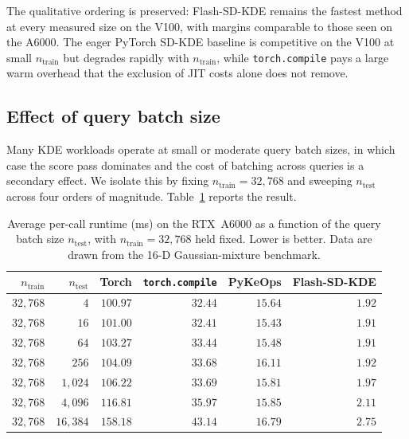 The qualitative ordering is preserved: Flash-SD-KDE remains the fastest
method at every measured size on the V100, with margins comparable to those
seen on the A6000.
The eager PyTorch SD-KDE baseline is competitive on the V100 at small
$n_{\text{train}}$ but degrades rapidly with $n_{\text{train}}$, while
\texttt{torch.compile} pays a large warm overhead that the exclusion of JIT
costs alone does not remove.

\subsection{Effect of query batch size}
\label{app:query_batching}

Many KDE workloads operate at small or moderate query batch sizes, in which
case the score pass dominates and the cost of batching across queries is a
secondary effect.
We isolate this by fixing $n_{\text{train}} = 32{,}768$ and sweeping
$n_{\text{test}}$ across four orders of magnitude.
Table~\ref{tab:rebuttal_query_batch} reports the result.

\begin{table}[t]
  \centering
  \small
  \setlength{\tabcolsep}{4pt}
  \begin{tabular}{rrrrrr}
    \toprule
    $n_{\text{train}}$ & $n_{\text{test}}$ &
    Torch & \texttt{torch.compile} & PyKeOps & Flash-SD-KDE \\
    \midrule
    $32{,}768$ & $4$      & $100.97$ & $32.44$ & $15.64$ & $1.92$ \\
    $32{,}768$ & $16$     & $101.00$ & $32.41$ & $15.43$ & $1.91$ \\
    $32{,}768$ & $64$     & $103.27$ & $33.44$ & $15.48$ & $1.91$ \\
    $32{,}768$ & $256$    & $104.09$ & $33.68$ & $16.11$ & $1.92$ \\
    $32{,}768$ & $1{,}024$  & $106.22$ & $33.69$ & $15.81$ & $1.97$ \\
    $32{,}768$ & $4{,}096$  & $116.81$ & $35.97$ & $15.85$ & $2.11$ \\
    $32{,}768$ & $16{,}384$ & $158.18$ & $43.14$ & $16.79$ & $2.75$ \\
    \bottomrule
  \end{tabular}
  \caption{Average per-call runtime (ms) on the RTX~A6000 as a function of
           the query batch size $n_{\text{test}}$, with
           $n_{\text{train}} = 32{,}768$ held fixed.
           Lower is better.
           Data are drawn from the 16-D Gaussian-mixture benchmark.}
  \label{tab:rebuttal_query_batch}
\end{table}


